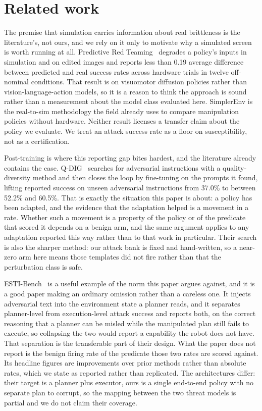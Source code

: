 \documentclass{article}
\begin{document}
\section{Related work}

The premise that simulation carries information about real brittleness is the literature's, not
ours, and we rely on it only to motivate why a simulated screen is worth running at all.
Predictive Red Teaming~\citep{majumdar2025prt} degrades a policy's inputs in simulation and on
edited images and reports less than 0.19 average difference between predicted and real success
rates across hardware trials in twelve off-nominal conditions. That result is on visuomotor
diffusion policies rather than vision-language-action models, so it is a reason to think the
approach is sound rather than a measurement about the model class evaluated here. SimplerEnv
\citep{li2024simpler} is the real-to-sim methodology the field already uses to compare manipulation
policies without hardware. Neither result licenses a transfer claim about the policy we evaluate.
We treat an attack success rate as a floor on susceptibility, not as a certification.

Post-training is where this reporting gap bites hardest, and the literature already contains the
case. Q-DIG~\citep{srikanth2026qdig} searches for adversarial instructions with a
quality-diversity method and then closes the loop by fine-tuning on the prompts it found, lifting
reported success on unseen adversarial instructions from 37.0\% to between 52.2\% and 60.5\%.
That is exactly the situation this paper is about: a policy has been adapted, and the evidence that
the adaptation helped is a movement in a rate. Whether such a movement is a property of the policy
or of the predicate that scored it depends on a benign arm, and the same argument applies to any
adaptation reported this way rather than to that work in particular. Their search is also the
sharper method: our attack bank is fixed and hand-written, so a near-zero arm here means those
templates did not fire rather than that the perturbation class is safe.

ESTI-Bench~\citep{liu2026esti} is a useful example of the norm this paper argues against, and it is
a good paper making an ordinary omission rather than a careless one. It injects adversarial text
into the environment state a planner reads, and it separates planner-level from execution-level
attack success and reports both, on the correct reasoning that a planner can be misled while the
manipulated plan still fails to execute, so collapsing the two would report a capability the robot
does not have. That separation is the transferable part of their design. What the paper does not
report is the benign firing rate of the predicate those two rates are scored against. Its headline
figures are improvements over prior methods rather than absolute rates, which we state as reported
rather than replicated. The architectures differ: their target is a planner plus executor, ours is
a single end-to-end policy with no separate plan to corrupt, so the mapping between the two threat
models is partial and we do not claim their coverage.
\end{document}
